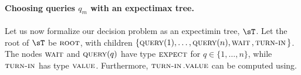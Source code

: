 \paragraph{Choosing queries $q_m$ with an expectimax tree.}
Let us now formalize our decision problem as an expectimin tree, $\sT$.
Let the root of $\sT$ be $\scroot$, with children $\{\query(1), \ldots, \query(n), \wait{}, \turnin{}\}$.
The nodes $\wait$ and $\query(q)$ have type $\scexpect$ for $q \in \{1, \ldots, n\}$, while $\turnin$ has type $\scvalue$.
Furthermore, $\turnin.\scvalue$ can be computed using.




